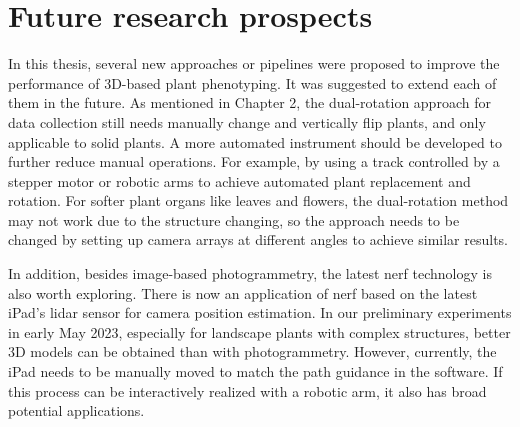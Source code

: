 \section{Future research prospects}

In this thesis, several new approaches or pipelines were proposed to improve the performance of 3D-based plant phenotyping. It was suggested to extend each of them in the future. As mentioned in Chapter 2, the dual-rotation approach for data collection still needs manually change and vertically flip plants, and only applicable to solid plants. A more automated instrument should be developed to further reduce manual operations. For example, by using a track controlled by a stepper motor or robotic arms to achieve automated plant replacement and rotation. For softer plant organs like leaves and flowers, the dual-rotation method may not work due to the structure changing, so the approach needs to be changed by setting up camera arrays at different angles to achieve similar results.

In addition, besides image-based photogrammetry, the latest \gls{nerf} technology is also worth exploring. There is now an application of \gls{nerf} based on the latest iPad's \gls{lidar} sensor for camera position estimation. In our preliminary experiments in early May 2023, especially for landscape plants with complex structures, better 3D models can be obtained than with photogrammetry. However, currently, the iPad needs to be manually moved to match the path guidance in the software. If this process can be interactively realized with a robotic arm, it also has broad potential applications.

